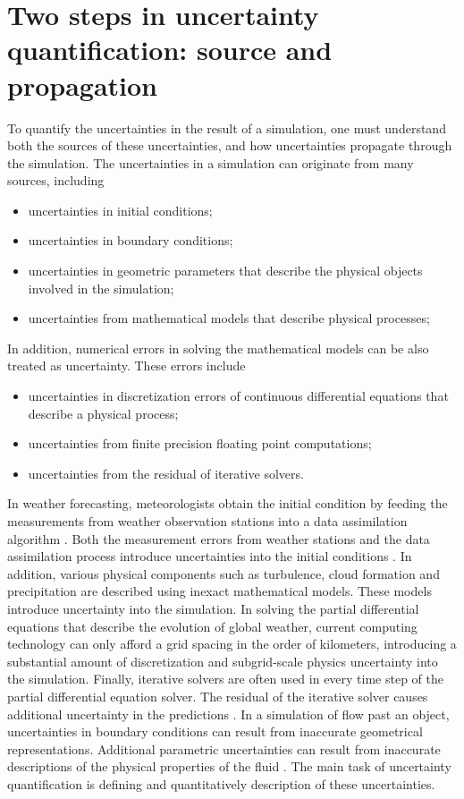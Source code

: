 


\section{Two steps in uncertainty quantification: source and propagation}
To quantify the uncertainties in the result of a simulation, one must
understand both the sources of these uncertainties, and how uncertainties
propagate through the simulation.  The uncertainties in a simulation can
originate from many sources, including
\begin{itemize}
\item uncertainties in initial conditions;
\item uncertainties in boundary conditions;
\item uncertainties in geometric parameters that describe the physical objects
      involved in the simulation;
\item uncertainties from mathematical models that describe physical processes;
\end{itemize}
In addition, numerical errors in solving the mathematical models can be
also treated as uncertainty.  These errors include
\begin{itemize}
\item uncertainties in discretization errors of continuous differential
      equations that describe a physical process;
\item uncertainties from finite precision floating point computations;
\item uncertainties from the residual of iterative solvers.
\end{itemize}
In weather forecasting, meteorologists obtain the initial condition
by feeding the measurements from weather observation
stations into a data assimilation algorithm \cite[]{weather4}.
Both the measurement errors from weather stations and the data assimilation
process introduce uncertainties into the initial conditions \cite[]{weather2}.
In addition,
various physical components such as turbulence, cloud formation and
precipitation are described using inexact mathematical models.
These models introduce
uncertainty into the simulation.  In solving the partial differential
equations that describe the evolution of global weather,
current computing technology can only afford a grid spacing in the order of
kilometers, introducing a substantial amount of discretization and subgrid-scale
physics uncertainty into the simulation.  Finally, iterative solvers
are often used in every time step of the partial differential equation solver.
The residual of the iterative solver causes additional uncertainty in the
predictions \cite[]{jameson01}.  In a simulation of flow past
an object, uncertainties in boundary conditions can result from
inaccurate geometrical representations.  Additional parametric uncertainties
can result from inaccurate descriptions of the physical properties of the
fluid \cite[]{design4}.  The main task of uncertainty quantification is defining
and quantitatively description of these uncertainties.

